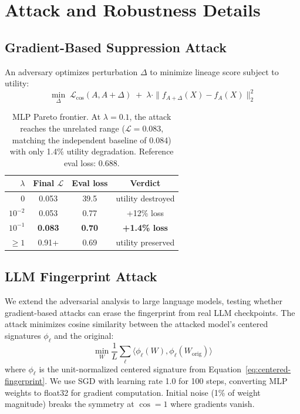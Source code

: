 \section{Attack and Robustness Details}\label{app:attacks}

\subsection{Gradient-Based Suppression Attack}

An adversary optimizes perturbation $\Delta$ to minimize lineage score subject to utility:
\begin{equation}
\min_{\Delta} \;\mathcal{L}_{\mathrm{cos}}(A, A + \Delta) \;+\; \lambda \cdot \|f_{A+\Delta}(X) - f_A(X)\|_2^2
\end{equation}

\begin{table}[h]
\centering
\small
\begin{tabular}{@{}rccc@{}}
\toprule
$\lambda$ & Final $\mathcal{L}$ & Eval loss & Verdict \\
\midrule
$0$         & 0.053 & 39.5 & utility destroyed \\
$10^{-2}$   & 0.053 & 0.77 & +12\% loss \\
$10^{-1}$   & \textbf{0.083} & \textbf{0.70} & \textbf{+1.4\% loss} \\
$\ge 1$     & 0.91+ & 0.69 & utility preserved \\
\bottomrule
\end{tabular}
\caption{MLP Pareto frontier. At $\lambda = 0.1$, the attack reaches the unrelated range ($\mathcal{L} = 0.083$, matching the independent baseline of 0.084) with only 1.4\% utility degradation. Reference eval loss: 0.688.}
\label{tab:mlp-attack}
\end{table}

\subsection{LLM Fingerprint Attack}\label{app:llm-attack}

We extend the adversarial analysis to large language models, testing whether gradient-based attacks can erase the fingerprint from real LLM checkpoints. The attack minimizes cosine similarity between the attacked model's centered signatures $\phi_\ell$ and the original:
\begin{equation}
\min_{W} \frac{1}{L} \sum_{\ell} \langle \phi_\ell(W), \phi_\ell(W_{\mathrm{orig}}) \rangle
\end{equation}
where $\phi_\ell$ is the unit-normalized centered signature from Equation~\ref{eq:centered-fingerprint}. We use SGD with learning rate 1.0 for 100 steps, converting MLP weights to float32 for gradient computation. Initial noise (1\% of weight magnitude) breaks the symmetry at $\cos = 1$ where gradients vanish.


